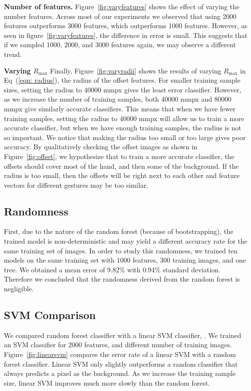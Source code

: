 \textbf{Number of features.} Figure~\ref{fig:varyfeatures} shows the effect of varying the number features. Across most of our experiments we observed that using 2000 features outperforms 3000 features, which outperforms 1000 features. However, as seen in figure~\ref{fig:varyfeatures}, the difference in error is small. This suggests that if we sampled 1000, 2000, and 3000 features again, we may observe a different trend.

\textbf{Varying $R_{\text{max}}$}
Finally, Figure~\ref{fig:varyradii} shows the results of varying $R_{\text{max}}$ in Eq~(\ref{eqn: radius}), the radius of the offset features. For smaller training sample sizes, setting the radius to 40000 mmpx gives the least error classifier. However, as we increase the number of training samples, both 40000 mmpx and 80000 mmpx give similarly accurate classifiers. This means that when we have fewer training samples, setting the radius to 40000 mmpx will allow us to train a more accurate classifier, but when we have enough training samples, the radius is not so important. We notice that making the radius too small or too large gives poor accuracy. By qualitatively checking the offset images as shown in Figure~\ref{fig:offset}, we hypothesize that to train a more accurate classifier, the offsets should cover most of the hand, and then some of the background. If the radius is too small, then the offsets will be right next to each other and feature vectors for different gestures may be too similar.

\subsection{ Randomness }
First, due to the nature of the random forest (because of bootstrapping), the trained model is non-deterministic and may yield a different accuracy rate for the same training set of images. In order to study this randomness, we trained ten models on the same training set with 1000 features, 300 training images, and one tree. We obtained a mean error of 9.82\% with 0.94\% standard deviation. Therefore we concluded that the randomness derived from the random forest is negligible. 

\subsection{ SVM Comparison}
We compared random forest classifier with a linear SVM classifier, \cite{liblinear}. We trained an SVM classifier for 2000 features, and different number of training images. 
Figure~\ref{fig:linearsvm} compares the error rate of a linear SVM with a random forest classifier. Linear SVM only slightly outperforms a random classifier that always predicts a pixel as the background. As we increase the training sample size, linear SVM improves much more slowly than the random forest.

